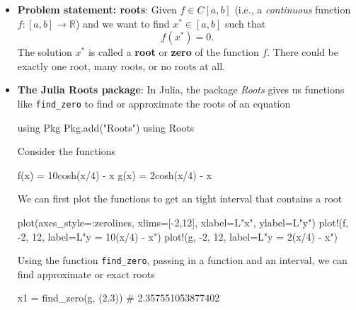 \documentclass{report}
\begin{document}
\begin{itemize}
        \item \textbf{Problem statement: roots}: 
            Given $f \in C[a,b]$ (i.e., a \textit{continuous} function $f \colon [a,b] \to \mathbb{R}$) and we want to find $x^* \in [a, b]$ such that
            $$
            f(x^*) = 0.
            $$
        The solution $x^*$ is called a \textbf{root} or \textbf{zero} of the function $f$. There could be exactly one root, many roots, or no roots at all.
    \item \textbf{The Julia Roots package}: In Julia, the package \textit{Roots} gives us functions like \texttt{find\_zero} to find or approximate the roots of an equation
        \bigbreak \noindent 
        \begin{jlcode}
        using Pkg
        Pkg.add("Roots")
        using Roots
        \end{jlcode}
        \bigbreak \noindent 
        Consider the functions
        \bigbreak \noindent 
        \begin{jlcode}
            f(x) = 10cosh(x/4) - x
            g(x) = 2cosh(x/4) - x
        \end{jlcode}
        \bigbreak \noindent 
        We can first plot the functions to get an tight interval that contains a root
        \bigbreak \noindent 
        \begin{jlcode}
            plot(axes_style=:zerolines, xlims=[-2,12], xlabel=L"x", ylabel=L"y")
            plot!(f, -2, 12, label=L"y = 10\cosh(x/4) - x")
            plot!(g, -2, 12, label=L"y = 2\cosh(x/4) - x")
        \end{jlcode}
        Using the function \texttt{find\_zero}, passing in a function and an interval, we can find approximate or exact roots 
        \bigbreak \noindent 
        \begin{jlcode}
        x1 = find_zero(g, (2,3))
        # 2.357551053877402


\end{jlcode}
\end{itemize}
\end{document}
